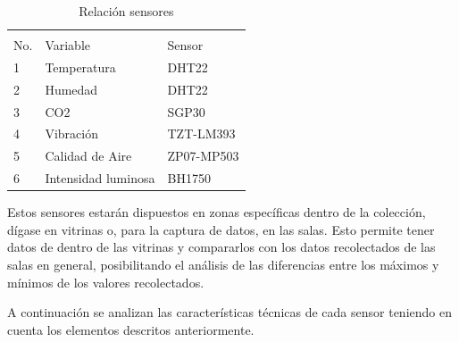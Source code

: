     \begin{table}[h]
        \centering
        \caption{Relación sensores}
        \label{tab:relacion_sensores}
        \begin{tabular}{|l|l|l|}
        \hline
        \cellcolor[HTML]{9698ED}                      & \cellcolor[HTML]{9698ED}                           & \cellcolor[HTML]{9698ED}                         \\
        \multirow{-2}{*}{\cellcolor[HTML]{9698ED}No.} & \multirow{-2}{*}{\cellcolor[HTML]{9698ED}Variable} & \multirow{-2}{*}{\cellcolor[HTML]{9698ED}Sensor} \\ \hline
        1                                             & Temperatura                                        & DHT22                                            \\ \hline
        2                                             & Humedad                                            & DHT22                                            \\ \hline
        3                                             & CO2                                                & SGP30                                            \\ \hline
        4                                             & Vibración                                          & TZT-LM393                                        \\ \hline
        5                                             & Calidad de Aire                                    & ZP07-MP503                                       \\ \hline
        6                                             & Intensidad luminosa                                & BH1750                                           \\ \hline
        \end{tabular}
    \end{table}

Estos sensores estarán dispuestos en zonas específicas dentro de la colección, dígase en vitrinas o, para la captura de datos, en las salas.
Esto permite tener datos de dentro de las vitrinas y compararlos con los datos recolectados de las salas en general, posibilitando el análisis de las diferencias entre los máximos y mínimos de los valores recolectados.
    
A continuación se analizan las características técnicas de cada sensor teniendo en cuenta los elementos descritos anteriormente.

